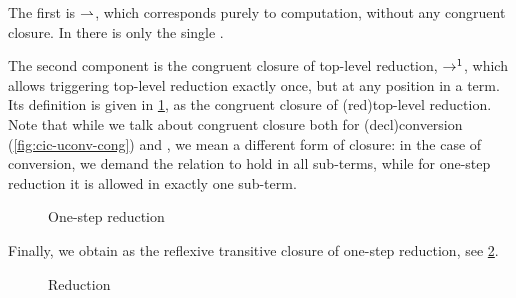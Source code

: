 \AP The first is  $\rightharpoonup$, which corresponds purely to computation, without any congruent closure.
In  there is only the single .

\AP The second component is the congruent closure of top-level reduction,
 $\rightarrow^1$, which allows triggering top-level reduction exactly once,
but at any position in a term. Its definition is given in \cref{fig:ccw-ored}, as
the congruent closure of \kl(red){top-level} reduction.
Note that while we talk about congruent closure both for
\kl(decl){conversion} (\cref{fig:cic-uconv-cong})
and , we mean a different form of closure:
in the case of conversion, we demand the relation to hold in all sub-terms,
while for one-step reduction it is allowed in exactly one sub-term.

\begin{figure}[ht]
  \ContinuedFloat
  \caption{One-step reduction}
  \label{fig:ccw-ored}
\end{figure}

Finally, we obtain  as the reflexive
transitive closure of one-step reduction, see \cref{fig:red}.

\begin{figure}[ht]
  \ContinuedFloat
  \caption{Reduction}
  \label{fig:red}
\end{figure}

